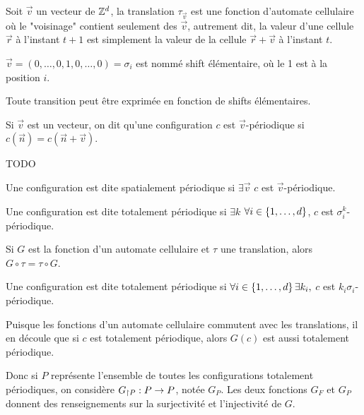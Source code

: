 \begin{definition}
	Soit $\vec v$ un vecteur de $\mathbb{Z}^d$, la translation $\tau_{\vec v}$ est une fonction d'automate cellulaire où le "voisinage" contient seulement des $\vec v$,
	autrement dit, la valeur d'une cellule $\vec r$ à l'instant $t+1$ est simplement la valeur de la cellule $\vec r + \vec v$ à l'instant $t$.


	$\vec v = (0,\ldots,0, 1, 0, \ldots, 0) = \sigma_i$ est nommé shift élémentaire, où le 1 est à la position $i$.

	Toute transition peut être exprimée en fonction de shifts élémentaires.
\end{definition}

\begin{definition}
	Si $\vec v$ est un vecteur, on dit qu'une configuration $c$ est $\vec v$-périodique si $c(\vec n) = c (\vec n + \vec v)$.
\end{definition}

\begin{exemple}
	TODO
\end{exemple}

\begin{definition}
	Une configuration est dite spatialement périodique si $\exists \vec v$ \tq $c$ est $\vec v$-périodique.
\end{definition}

\begin{definition}
	Une configuration est dite totalement périodique si $\exists k$ \tq $\forall i \in \left\{1,\ldots,d\right\}$, $c$ est $\sigma_i^k$-périodique.
\end{definition}

\begin{prop}
	Si $G$ est la fonction d'un automate cellulaire et $\tau$ une translation, alors $G \circ \tau = \tau \circ G$.
\end{prop}

\begin{definition}
	Une configuration est dite totalement périodique si $\forall i \in \left\{1,\ldots,d\right\}\exists k_i, $ \tq $c$ est $k_i\sigma_i$-périodique.
\end{definition}

\begin{remarque}
	Puisque les fonctions d'un automate cellulaire commutent avec les translations, il en découle que si $c$ est totalement périodique, alors $G(c)$
	est aussi totalement périodique.

	Donc si $P$ représente l'ensemble de toutes les configurations totalement périodiques, on considère $G_{\restriction P} : P \to P$, notée $G_P$.
	Les deux fonctions $G_F$ et $G_P$ donnent des renseignements sur la surjectivité et l'injectivité de $G$.
\end{remarque}

